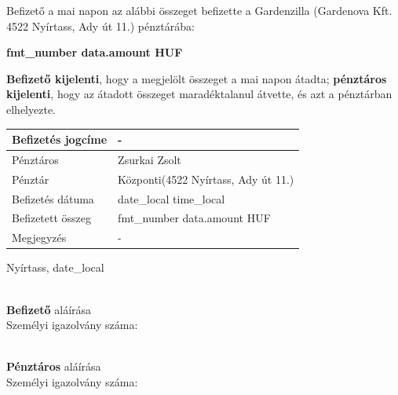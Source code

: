 \rule[4\baselineskip]{0pt}{0pt}%

\begin{minipage}[t]{0.9\textwidth}
  {\normalsize Befizető a mai napon az alábbi összeget befizette a Gardenzilla (Gardenova Kft. 4522 Nyírtass, Ady út 11.) pénztárába:}

  \begin{center}
    {\bf \Large {{fmt_number data.amount}} HUF}
  \end{center}

  \bigskip

  {\bf Befizető kijelenti}, hogy a megjelölt összeget a mai napon átadta; {\bf pénztáros kijelenti}, hogy az átadott összeget maradéktalanul átvette, és azt a pénztárban elhelyezte.

  \rule[2\baselineskip]{0pt}{0pt}

  \renewcommand{\arraystretch}{1.5}

  \begin{tabular}{ |p{3cm}|p{10cm}| }
    \hline
    Befizetés jogcíme & -                                                 \\
    \hline
    Pénztáros         & Zsurkai Zsolt                                     \\
    \hline
    Pénztár           & Központi\footnotemark (4522 Nyírtass, Ady út 11.) \\
    \hline
    Befizetés dátuma  & {{date_local}} {{time_local}}                     \\
    \hline
    Befizetett összeg & {{fmt_number data.amount}} HUF                    \\
    \hline
    Megjegyzés        & -                                                 \\
    \hline
  \end{tabular}

  \rule[2\baselineskip]{0pt}{0pt}

  Nyírtass, {{date_local}}
\end{minipage}

\rule[3\baselineskip]{0pt}{0pt}

\begin{minipage}[t]{0.45\textwidth}
  \makebox[2.5in]{\hrulefill} \\
  {\bf Befizető} aláírása \\
  Személyi igazolvány száma:
\end{minipage}
\hfill
\begin{minipage}[t]{0.45\textwidth}
  \makebox[2.5in]{\hrulefill} \\
  {\bf Pénztáros} aláírása\\
  Személyi igazolvány száma:
\end{minipage}

